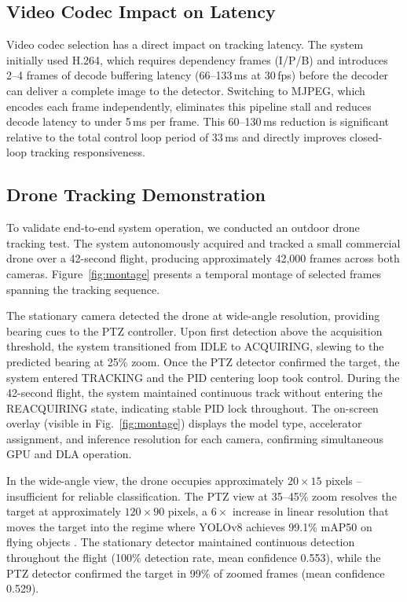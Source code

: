 \documentclass[conf]{new-aiaa}
\begin{document}
\subsection{Video Codec Impact on Latency}
Video codec selection has a direct impact on tracking latency. The system initially used H.264, which requires dependency frames (I/P/B) and introduces 2--4 frames of decode buffering latency (66--133\,ms at 30\,fps) before the decoder can deliver a complete image to the detector. Switching to MJPEG, which encodes each frame independently, eliminates this pipeline stall and reduces decode latency to under 5\,ms per frame. This 60--130\,ms reduction is significant relative to the total control loop period of 33\,ms and directly improves closed-loop tracking responsiveness.

\subsection{Drone Tracking Demonstration}
To validate end-to-end system operation, we conducted an outdoor drone tracking test. The system autonomously acquired and tracked a small commercial drone over a 42-second flight, producing approximately 42,000 frames across both cameras. Figure~\ref{fig:montage} presents a temporal montage of selected frames spanning the tracking sequence.

The stationary camera detected the drone at wide-angle resolution, providing bearing cues to the PTZ controller. Upon first detection above the acquisition threshold, the system transitioned from IDLE to ACQUIRING, slewing to the predicted bearing at 25\% zoom. Once the PTZ detector confirmed the target, the system entered TRACKING and the PID centering loop took control. During the 42-second flight, the system maintained continuous track without entering the REACQUIRING state, indicating stable PID lock throughout. The on-screen overlay (visible in Fig.~\ref{fig:montage}) displays the model type, accelerator assignment, and inference resolution for each camera, confirming simultaneous GPU and DLA operation.

In the wide-angle view, the drone occupies approximately $20 \times 15$ pixels -- insufficient for reliable classification. The PTZ view at 35--45\% zoom resolves the target at approximately $120 \times 90$ pixels, a $6\times$ increase in linear resolution that moves the target into the regime where YOLOv8 achieves 99.1\% mAP50 on flying objects \cite{yolo_flying}. The stationary detector maintained continuous detection throughout the flight (100\% detection rate, mean confidence 0.553), while the PTZ detector confirmed the target in 99\% of zoomed frames (mean confidence 0.529).
\end{document}
